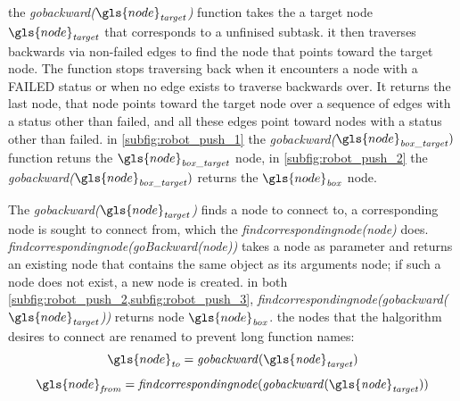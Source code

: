  the \textit{gobackward($\gls{node}_\mathit{target}$)} function takes the a target node $\gls{node}_\mathit{target}$ that corresponds to a unfinised subtask. it then traverses backwards via non-failed edges to find the node that points toward the target node. The function stops traversing back when it encounters a node with a FAILED status or when no edge exists to traverse backwards over. It returns the last node, that node points toward the target node over a sequence of edges with a status other than failed, and all these edges point toward nodes with a status other than failed. in \cref{subfig:robot_push_1} the \textit{gobackward($\gls{node}_\mathit{box\_target})$} function retuns the $\gls{node}_\mathit{box\_target}$ node, in \cref{subfig:robot_push_2} the \textit{gobackward($\gls{node}_\mathit{box\_target})$} returns the $\gls{node}_\mathit{box}$ node.\bs

The \textit{gobackward($\gls{node}_\mathit{target}$)} finds a node to connect to, a corresponding node is sought to connect from, which the \textit{findcorrespondingnode(\gls{node})} does. \textit{findcorrespondingnode(goBackward(\gls{node}))} takes a node as parameter and returns an existing node that contains the same object as its arguments node; if such a node does not exist, a new node is created. in both \cref{subfig:robot_push_2,subfig:robot_push_3}, \textit{findcorrespondingnode(gobackward($\gls{node}_\mathit{target}$))} returns node $\gls{node}_\mathit{box}$. the nodes that the \ac{halgorithm} desires to connect are renamed to prevent long function names: 
\[\gls{node}_\mathit{to} =  \mathit{gobackward(\gls{node}_\mathit{target})}\]
\[\gls{node}_\mathit{from} = \mathit{findcorrespondingnode(gobackward(\gls{node}_\mathit{target}))}\]


